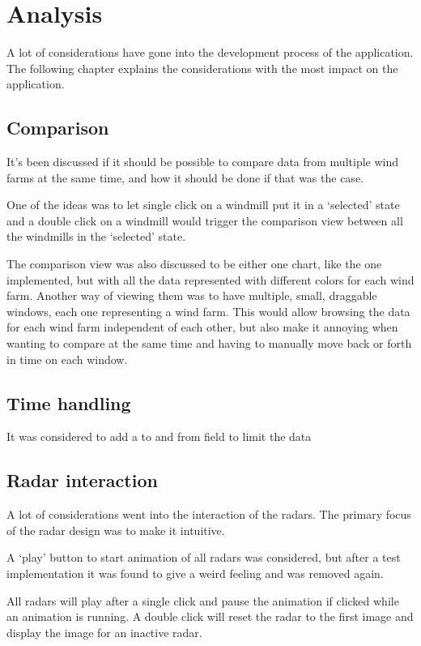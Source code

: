 \chapter{Analysis}
\label{sec:analysis}
A lot of considerations have gone into the development process of the application. The following chapter explains the considerations with the most impact on the application.

\section{Comparison}
It's been discussed if it should be possible to compare data from multiple wind farms at the same time, and how it should be done if that was the case.

One of the ideas was to let single click on a windmill put it in a `selected' state and a double click on a windmill would trigger the comparison view between all the windmills in the `selected' state.

The comparison view was also discussed to be either one chart, like the one implemented, but with all the data represented with different colors for each wind farm.
Another way of viewing them was to have multiple, small, draggable windows, each one representing a wind farm. This would allow browsing the data for each wind farm independent of each other, but also make it annoying when wanting to compare at the same time and having to manually move back or forth in time on each window.

\section{Time handling}
It was considered to add a to and from field to limit the data

\section{Radar interaction}
A lot of considerations went into the interaction of the radars. The primary focus of the radar design was to make it intuitive.

A `play' button to start animation of all radars was considered, but after a test implementation it was found to give a weird feeling and was removed again.

All radars will play after a single click and pause the animation if clicked while an animation is running. A double click will reset the radar to the first image and display the image for an inactive radar.

